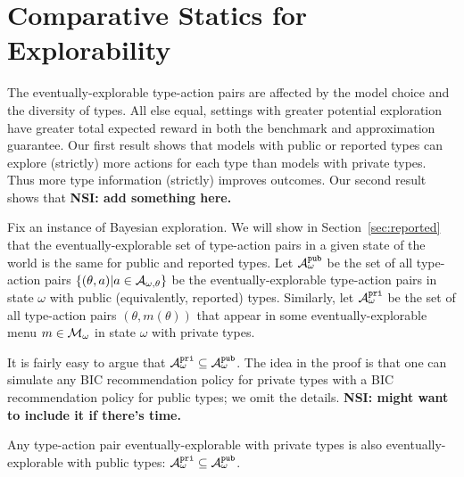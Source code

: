 
\section{Comparative Statics for Explorability}
\label{sec:statics}

\newcommand{\pairs}{\AExp_{\omega}}
\newcommand{\pairsPub}{\pairs^{\term{pub}}}
\newcommand{\pairsPri}{\pairs^{\term{pri}}}

\newcommand{\support}{\term{support}}

The eventually-explorable type-action pairs are affected by the model choice and the diversity of types.  All else equal, settings with greater potential exploration have greater total expected reward in both the benchmark and approximation guarantee.  
%
Our first result shows that models with public or reported types can explore (strictly) more actions for each type than models with private types.  Thus more type information (strictly) improves outcomes.
%
Our second result shows that {\bf NSI: add something here.}

Fix an instance of Bayesian exploration. We will show in Section~\ref{sec:reported} that the eventually-explorable set of type-action pairs in a given state of the world is the same for public and reported types. Let $\pairsPub$ be the set of all type-action pairs $\{(\theta,a)|a\in\mathcal{A}_{\omega,\theta}\}$ be the eventually-explorable type-action pairs in state $\omega$ with public (equivalently, reported) types.  Similarly, let $\pairsPri$ be the set of all type-action pairs $(\theta,m(\theta))$ that appear in some eventually-explorable menu $m\in \mathcal{M}_{\omega}$ in state $\omega$ with private types.

It is fairly easy to argue that $\pairsPri \subseteq \pairsPub$. The idea in the proof is that one can simulate any BIC recommendation policy for private types with a BIC recommendation policy for public types; we omit the details. {\bf NSI: might want to include it if there's time.}

\begin{claim}
	Any type-action pair eventually-explorable with private types is also eventually-explorable with public types: $\pairsPri \subseteq \pairsPub$.
\end{claim}


